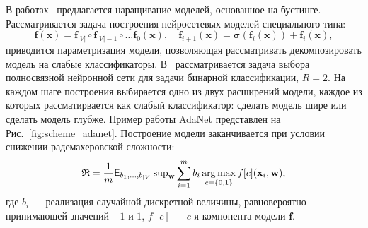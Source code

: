 В работах~\cite{boost_res,adanet} предлагается наращивание моделей, основанное на бустинге. Рассматривается задача построения нейросетевых моделей специального типа:
\[
    \mathbf{f}(\mathbf{x}) = \mathbf{f}_{|V|} \circ \mathbf{f}_{|V|-1} \circ \dots \mathbf{f}_0(\mathbf{x}), \quad  \mathbf{f}_{i+1}(\mathbf{x}) = \boldsymbol{\sigma}\left(\mathbf{f}_i(\mathbf{x})\right) + \mathbf{f}_i(\mathbf{x}),
\]
приводится параметризация модели, позволяющая рассматривать декомпозировать модель на слабые классификаторы.
В~\cite{adanet} рассматривается задача выбора полносвязной нейронной сети для задачи бинарной классификации, $R=2$. На каждом шаге построения выбирается одно из двух расширений модели, каждое из которых рассматирвается как слабый классификатор: сделать модель шире или сделать модель глубже. Пример работы AdaNet представлен на Рис.~\ref{fig:scheme_adanet}.
Построение модели заканчивается при условии снижении радемахеровской сложности:
\begin{equation}
\label{eq:rad}
    \mathfrak{R} = \frac{1}{m}\mathsf{E}_{{b}_1,\dots, {b}_{|V|}} \text{sup}_{\mathbf{w}} \sum_{i=1}^m {b}_i \operatorname*{arg\,max}_{c = \{0,1\}}f[c](\mathbf{x}_i, \mathbf{w}),
\end{equation}
где ${b}_i$ --- реализация случайной дискретной величины, равновероятно принимающей значений $-1$ и $1$, $f[c]$ --- $c$-я компонента модели $\mathbf{f}$.


